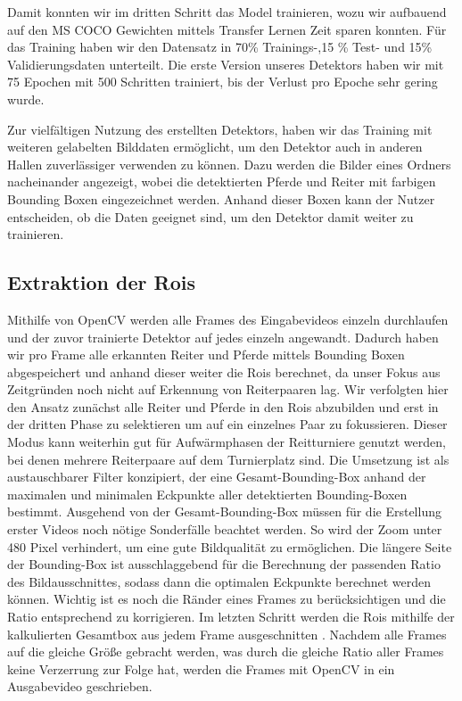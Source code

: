Damit konnten wir im dritten Schritt das Model trainieren, wozu wir aufbauend auf den MS COCO Gewichten mittels Transfer Lernen Zeit sparen konnten. Für das Training haben wir den Datensatz in 70\% Trainings-,15 \% Test- und 15\% Validierungsdaten unterteilt. Die erste Version unseres Detektors haben wir mit 75 Epochen mit 500 Schritten trainiert, bis der Verlust pro Epoche sehr gering wurde.

Zur vielfältigen Nutzung des erstellten Detektors, haben wir das Training mit weiteren gelabelten Bilddaten ermöglicht, um den Detektor auch in anderen Hallen zuverlässiger verwenden zu können. Dazu werden die Bilder eines Ordners nacheinander angezeigt, wobei die detektierten Pferde und Reiter mit farbigen Bounding Boxen eingezeichnet werden. Anhand dieser Boxen kann der Nutzer entscheiden, ob die Daten geeignet sind, um den Detektor damit weiter zu trainieren.

\subsection{Extraktion der Rois}

Mithilfe von OpenCV werden alle Frames des Eingabevideos einzeln durchlaufen und der zuvor trainierte Detektor auf jedes einzeln angewandt. Dadurch haben wir pro Frame alle erkannten Reiter und Pferde mittels Bounding Boxen abgespeichert und anhand dieser weiter die Rois berechnet, da unser Fokus aus Zeitgründen noch nicht auf Erkennung von Reiterpaaren lag. Wir verfolgten hier den Ansatz zunächst alle Reiter und Pferde in den Rois abzubilden und erst in der dritten Phase zu selektieren um auf ein einzelnes Paar zu fokussieren. Dieser Modus kann weiterhin gut für Aufwärmphasen der Reitturniere genutzt werden, bei denen mehrere Reiterpaare auf dem Turnierplatz sind. Die Umsetzung ist als austauschbarer Filter konzipiert, der eine Gesamt-Bounding-Box anhand der maximalen und minimalen Eckpunkte aller detektierten Bounding-Boxen bestimmt.
Ausgehend von der Gesamt-Bounding-Box müssen für die Erstellung erster Videos noch nötige Sonderfälle beachtet werden. So wird der Zoom unter 480 Pixel verhindert, um eine gute Bildqualität zu ermöglichen. Die längere Seite der Bounding-Box ist ausschlaggebend für die Berechnung der passenden Ratio des Bildausschnittes, sodass dann die optimalen  Eckpunkte berechnet werden können. Wichtig ist es noch die Ränder eines Frames zu berücksichtigen und die Ratio entsprechend zu korrigieren.
Im letzten Schritt werden die Rois mithilfe der kalkulierten Gesamtbox aus jedem Frame ausgeschnitten  . Nachdem alle Frames auf die gleiche Größe gebracht werden, was durch die gleiche Ratio aller Frames keine Verzerrung zur Folge hat, werden die Frames mit OpenCV in ein Ausgabevideo geschrieben.


